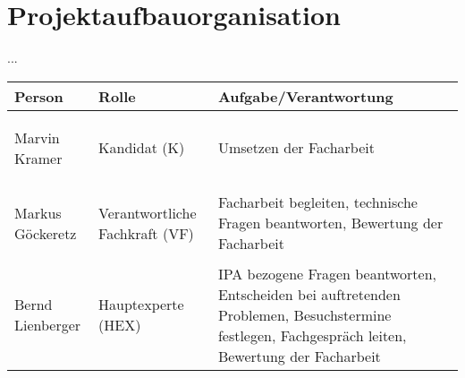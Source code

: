\chapter{Projektaufbauorganisation}\label{ch:projektaufbauorganisation}
...

\renewcommand{\arraystretch}{1.5}
\begin{longtable}{|p{}|p{}|p{}|}
    \hline
    \textbf{Person} & \textbf{Rolle} & \textbf{Aufgabe/Verantwortung} \\
    \hline
    \hypertarget{k}{Marvin Kramer} & Kandidat (K) & Umsetzen der Facharbeit \\
    \hline
    \hypertarget{vf}{Markus Göckeretz} & Verantwortliche Fachkraft (VF) & Facharbeit begleiten, technische Fragen beantworten, Bewertung der Facharbeit \\
    \hline
    \hypertarget{hex}{Bernd Lienberger} & Hauptexperte (HEX) & IPA bezogene Fragen beantworten, Entscheiden bei auftretenden Problemen, Besuchstermine festlegen, Fachgespräch leiten, Bewertung der Facharbeit \\
    \hline
\end{longtable}
\renewcommand{\arraystretch}{1}
